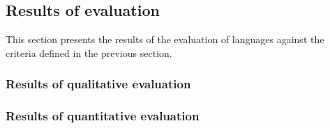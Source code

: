 \subsection{Results of evaluation}\label{subsec:results-of-evaluation}

This section presents the results of the evaluation of languages against the criteria defined in the previous section.

\subsubsection{Results of qualitative evaluation}


\subsubsection{Results of quantitative evaluation}

